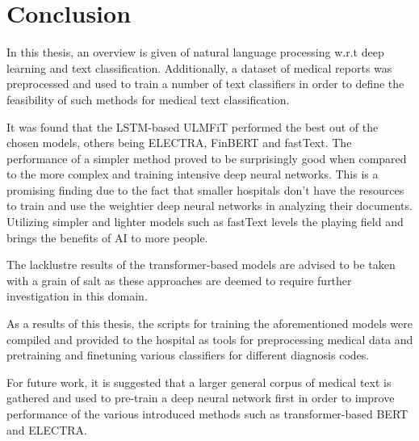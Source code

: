 \chapter{Conclusion} \label{Conclusion}
In this thesis, an overview is given of natural language processing w.r.t deep learning and text classification.
Additionally, a dataset of medical reports was preprocessed and used to train a number of text classifiers in order to define the feasibility of such methods for medical text classification.

It was found that the LSTM-based ULMFiT performed the best out of the chosen models, others being ELECTRA, FinBERT and fastText.
The performance of a simpler method proved to be surprisingly good when compared to the more complex and training intensive deep neural networks.
This is a promising finding due to the fact that smaller hospitals don't have the resources to train and use the weightier deep neural networks in analyzing their documents.
Utilizing simpler and lighter models such as fastText levels the playing field and brings the benefits of AI to more people.

The lacklustre results of the transformer-based models are advised to be taken with a grain of salt as these approaches are deemed to require further investigation in this domain.

As a results of this thesis, the scripts for training the aforementioned models were compiled and provided to the hospital as tools for preprocessing medical data and pretraining and finetuning various classifiers for different diagnosis codes.

For future work, it is suggested that a larger general corpus of medical text is gathered and used to pre-train a deep neural network first in order to improve performance of the various introduced methods such as transformer-based BERT and ELECTRA.
